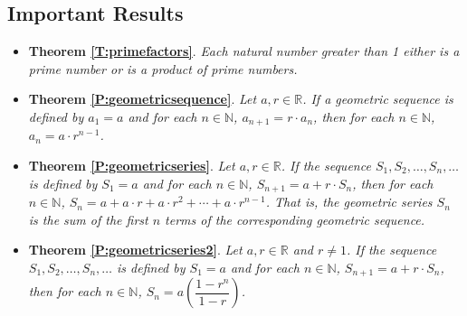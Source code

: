 \subsection*{Important Results}

\begin{itemize}
\item \textbf{Theorem \ref{T:primefactors}}.  
\emph{Each natural number greater than 1 either is a prime number or is a product of prime numbers.}


\item \textbf{Theorem \ref{P:geometricsequence}}.  
\emph{Let  $a, r \in \mathbb{R}$.  If a geometric sequence is defined by  $a_1  = a$ and for each  $n \in \mathbb{N}$,  $a_{n + 1}  = r \cdot a_n $, then for each  $n \in \mathbb{N}$,   $a_n  = a \cdot r^{n - 1} $.}

\item \textbf{Theorem \ref{P:geometricseries}}.  
\emph{Let  $a, r \in \mathbb{R}$.  If the sequence  $S_1 ,S_2 , \ldots ,S_n , \ldots $ is defined by  $S_1  = a$ and for each  $n \in \mathbb{N}$,  $S_{n + 1}  = a + r \cdot S_n $, then for each  $n \in \mathbb{N}$,   $S_n  = a + a \cdot r + a \cdot r^2  +  \cdots  + a \cdot r^{n - 1} $.  That is, the geometric series  $S_n $ is the sum of the first  $n$  terms of the corresponding geometric sequence.}

\item \textbf{Theorem \ref{P:geometricseries2}}.  
\emph{Let  $a, r \in \mathbb{R}$ and  $r \ne 1$.  If the sequence  $S_1 ,S_2 , \ldots ,S_n , \ldots $ is defined by  $S_1  = a$ and for each  $n \in \mathbb{N}$,  $S_{n + 1}  = a + r \cdot S_n $, then for each  $n \in \mathbb{N}$, $S_n  = a\left( {\dfrac{{1 - r^n }}{{1 - r}}} \right)$.}

\end{itemize}








\endinput
